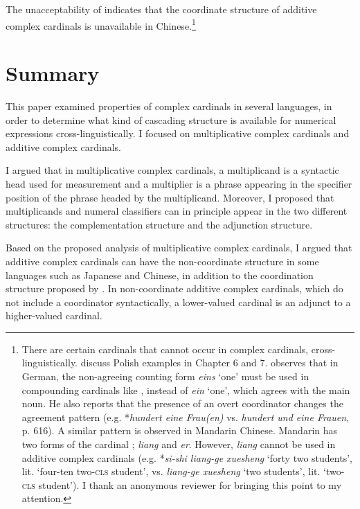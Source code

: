 \documentclass[output=paper]{langscibook}
\begin{document}
\noindent The unacceptability of  indicates that the coordinate structure of additive complex cardinals is unavailable in Chinese.\footnote{There are certain cardinals that cannot occur in complex cardinals, cross-linguistically. \citeauthor{IoninMatushansky2018} discuss Polish examples in Chapter 6 and 7. \citet{Hurford2003} observes that in German, the non-agreeing counting form \textit{eins} `one' must be used in compounding cardinals like , instead of \textit{ein} `one', which agrees with the main noun. He also reports that the presence of an overt coordinator changes the agreement pattern (e.g. *\textit{hundert eine Frau(en)} vs. \textit{hundert und eine Frauen}, p. 616). A similar pattern is observed in Mandarin Chinese. Mandarin has two forms of the cardinal ; \textit{liang} and \textit{er}. However, \textit{liang} cannot be used in additive complex cardinals (e.g. *\textit{si-shi liang-ge xuesheng} `forty two students', lit. `four-ten two-\textsc{cls} student', vs. \textit{liang-ge xuesheng} `two students', lit. `two-\textsc{cls} student'). I thank an anonymous reviewer for bringing this point to my attention.}


\section{Summary}\label{tat:sec:sumsum}
This paper examined properties of complex cardinals in several languages, in order to determine what kind of cascading structure is available for numerical expressions cross-linguistically. I focused on multiplicative complex cardinals and additive complex cardinals. 

I argued that in multiplicative complex cardinals, a multiplicand is a syntactic head used for measurement and a multiplier is a phrase appearing in the specifier position of the phrase headed by the multiplicand. Moreover, I proposed that multiplicands and numeral classifiers can in principle appear in the two different structures: the complementation structure and the adjunction structure.

Based on the proposed analysis of multiplicative complex cardinals, I argued that additive complex cardinals can have the non-coordinate structure in some languages such as Japanese and Chinese, in addition to the coordination structure proposed by \citet{IoninMatushansky2018}. In non-coordinate additive complex cardinals, which do not include a coordinator syntactically, a lower-valued cardinal is an adjunct to a higher-valued cardinal.
\end{document}

